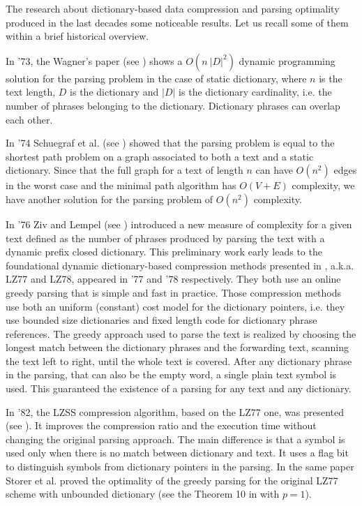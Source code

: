\documentclass[12pt]{article}
\theoremstyle{plain}
\theoremstyle{definition}
\theoremstyle{remark}
\begin{document}
The research about dictionary-based data compression and parsing optimality produced in the last decades some noticeable results. Let us recall some of them within a brief historical overview.



In '73, the Wagner's paper (see \cite{DBLP:journals/cacm/Wagner73}) shows a $O(n\ |D|^2)$ dynamic programming solution for the parsing problem in the case of static dictionary, where 
$n$ is the text length, $D$ is the dictionary and $|D|$ is the dictionary cardinality, i.e. the number of phrases belonging to the dictionary. Dictionary phrases can overlap each other. 

In '74 Schuegraf et al. (see \cite{Schuegraf}) showed that the parsing problem is equal to the shortest path problem on a graph associated to both a text and a static dictionary.
Since that the full graph for a text of length $n$ can have $O(n^2)$ edges in the worst case and the minimal path algorithm has $O(V +E)$ complexity, we have another solution for the parsing problem of  $O(n^2)$ complexity.


In '76 Ziv and Lempel (see \cite{DBLP:journals/tit/LempelZ76}) introduced a new measure of complexity for a given text defined as the number of phrases produced by parsing the text with a dynamic prefix closed dictionary. This preliminary work early leads to the foundational dynamic dictionary-based compression methods presented in \cite{lz77,lz78}, a.k.a. LZ77 and LZ78, appeared in '77 and '78 respectively.
They both use an online greedy parsing that is simple and fast in practice. 
Those compression methods use both an uniform (constant) cost model for the dictionary pointers, i.e. they use bounded size dictionaries and fixed length code for dictionary phrase references. The greedy approach used to parse the text is realized by choosing the longest match between the dictionary phrases and the forwarding text, scanning the text left to right, until the whole text is covered. After any dictionary phrase in the parsing, that can also be the empty word, a single plain text symbol is used. This guaranteed the existence of a parsing for any text and any dictionary.

In '82, the LZSS compression algorithm, based on the LZ77 one, was presented (see \cite{DBLP:journals/jacm/StorerS82}). It improves the compression ratio and the execution time without changing the original parsing approach. The main difference is that a symbol is used only when there is no match between dictionary and text. 
It uses a flag bit to distinguish symbols from dictionary pointers in the parsing. In the same paper Storer et al. proved the optimality of the greedy parsing for the original LZ77 scheme with unbounded dictionary (see the Theorem 10 in \cite{DBLP:journals/jacm/StorerS82} with $p=1$).  
\end{document}
